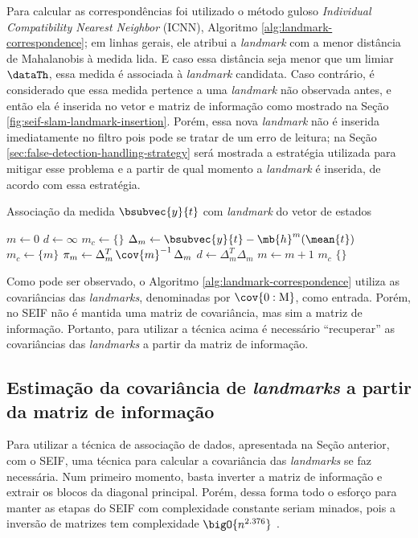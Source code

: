 Para calcular as correspondências foi utilizado o método guloso \textit{Individual Compatibility Nearest Neighbor} (ICNN), Algoritmo \ref{alg:landmark-correspondence}; em linhas gerais,
ele atribui a \textit{landmark} com a menor distância de Mahalanobis \cite{mclachlan1999mahalanobis} 
à medida lida. E caso essa distância seja menor que um limiar $\dataTh$, essa medida é associada à 
\textit{landmark} candidata. Caso contrário, é considerado que essa 
medida pertence a uma \textit{landmark} não observada antes, e então ela 
é inserida no vetor e matriz de informação como mostrado na Seção \ref{fig:seif-slam-landmark-insertion}. Porém, essa nova \textit{landmark} não é inserida imediatamente no filtro pois pode se tratar de um erro de leitura; na Seção \ref{sec:false-detection-handling-strategy} será mostrada a estratégia utilizada para mitigar esse problema e a partir de qual momento a \textit{landmark} é inserida, de acordo com essa estratégia.
\begin{algorithm}[h]
  \caption{Associação da medida $\bsubvec{y}{t}$ com \textit{landmark} do vetor de estados}
  \label{alg:landmark-correspondence}
\begin{algorithmic}[1]
  \State $m \gets 0$
  \State $d \gets \infty$
  \State $m_c \gets \{\}$
    \State $\Delta_m \gets \bsubvec{y}{t} - \mb{h}^{m}(\mean{t})$
      \State $m_c \gets \{m\}$
      \State $\pi_m \gets \Delta_m^T \, \cov{m}^{-1} \, \Delta_m$
      \State $d \gets \Delta_m^T\Delta_m$
    \EndIf
    \State $m \gets m + 1$
  \EndWhile
    \State \Return $m_c$
  \EndIf
  \State \Return $\{\}$
  \EndProcedure
\end{algorithmic}
\end{algorithm}

Como pode ser observado, o Algoritmo \ref{alg:landmark-correspondence} utiliza as covariâncias das 
\textit{landmarks}, denominadas por $\cov{0:\mathrm{M}}$, como 
entrada. Porém, no SEIF não é mantida uma matriz de covariância, mas sim a matriz de informação. Portanto, para utilizar a técnica acima é 
necessário ``recuperar'' as covariâncias das \textit{landmarks} a partir 
da matriz de informação.

\subsection{Estimação da covariância de \textit{landmarks} a partir da 
matriz de informação}
Para utilizar a técnica de associação de dados, apresentada na Seção 
anterior, com o SEIF, uma técnica para calcular a covariância das \textit{landmarks} se faz necessária. Num primeiro momento, basta inverter a 
matriz de informação e extrair os blocos da diagonal principal. Porém, 
dessa forma todo o esforço para manter as etapas do SEIF com 
complexidade constante seriam minados, pois a inversão de matrizes tem 
complexidade $\bigO{n^{2.376}}$ \cite{coppersmith1987matrix}.

